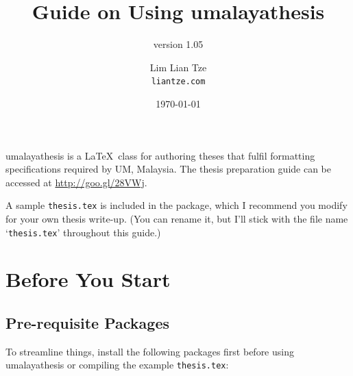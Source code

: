 \documentclass[a4paper,12pt]{scrartcl}
\title{Guide on Using umalayathesis}
\subtitle{version 1.05}
\author{Lim Lian Tze\\\texttt{\smaller liantze\string@gmail.com}}
\date{\smaller\today}
\begin{document}
\maketitle

%

%
%

\textsf{umalayathesis} is a \LaTeX\ class for authoring theses that fulfil formatting specifications required by \gls{UM}, Malaysia. The thesis preparation guide can be accessed at \url{http://goo.gl/28VWj}. 

A sample \texttt{thesis.tex} is included in the package, which I recommend you modify for your own thesis write-up. (You can rename it, but I'll stick with the file name `\texttt{thesis.tex}' throughout this guide.)

\section{Before You Start}
\subsection{Pre-requisite Packages}
To streamline things, install the following packages first before using \textsf{umalayathesis} or compiling the example \texttt{thesis.tex}:
\end{document}
